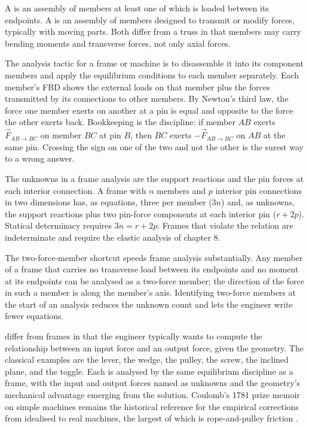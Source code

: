 A  is an assembly of members at least one of which is
loaded between its endpoints. A  is an assembly of
members designed to transmit or modify forces, typically with
moving parts. Both differ from a truss in that members may carry
bending moments and transverse forces, not only axial forces.

The analysis tactic for a frame or machine is to disassemble it
into its component members and apply the equilibrium conditions to
each member separately. Each member's FBD shows the external loads
on that member plus the forces transmitted by its connections to
other members. By Newton's third law, the force one member exerts
on another at a pin is equal and opposite to the force the other
exerts back. Bookkeeping is the discipline: if member $AB$ exerts
$\vec{F}_{AB \to BC}$ on member $BC$ at pin $B$, then $BC$ exerts
$-\vec{F}_{AB \to BC}$ on $AB$ at the same pin. Crossing the sign on
one of the two and not the other is the surest way to a wrong
answer.

The unknowns in a frame analysis are the support reactions and the
pin forces at each interior connection. A frame with $n$ members
and $p$ interior pin connections in two dimensions has, as
equations, three per member ($3n$) and, as unknowns, the support
reactions plus two pin-force components at each interior pin ($r +
2p$). Statical determinacy requires $3n = r + 2p$. Frames that
violate the relation are indeterminate and require the elastic
analysis of chapter 8.

The two-force-member shortcut speeds frame analysis substantially.
Any member of a frame that carries no transverse load between its
endpoints and no moment at its endpoints can be analysed as a
two-force member; the direction of the force in such a member is
along the member's axis. Identifying two-force members at the
start of an analysis reduces the unknown count and lets the
engineer write fewer equations.

 differ from frames in that the engineer
typically wants to compute the relationship between an input force
and an output force, given the geometry. The classical examples are
the lever, the wedge, the pulley, the screw, the inclined plane,
and the toggle. Each is analysed by the same equilibrium discipline
as a frame, with the input and output forces named as unknowns and
the geometry's mechanical advantage emerging from the solution.
Coulomb's 1781 prize memoir on simple machines remains the
historical reference for the empirical corrections from idealised
to real machines, the largest of which is rope-and-pulley friction
\cite{hist:coulomb1781}.

